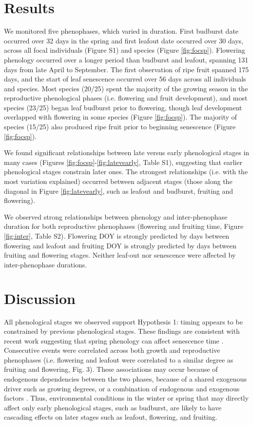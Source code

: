 \documentclass{article}
\begin{document}
\section* {Results}
\par We monitored five phenophases, which varied in duration. First budburst date occurred over 32 days in the spring and first leafout date occurred over 30 days, across all focal individuals (Figure S1) and species (Figure \ref{fig:focsp}). Flowering phenology occurred over a longer period than budburst and leafout, spanning 131 days from late April to September. The first observation of ripe fruit spanned 175 days, and the start of leaf senescence occurred over 56 days across all individuals and species. Most species (20/25) spent the majority of the growing season in the reproductive phenological phases (i.e. flowering and fruit development), and most species (23/25) began leaf budburst prior to flowering, though leaf development overlapped with flowering in some species (Figure \ref{fig:focsp}). The majority of species (15/25) also produced ripe fruit prior to beginning senescence (Figure \ref{fig:focsp}).
\par We found significant relationships between late versus early phenological stages in many cases (Figures \ref{fig:focsp}-\ref{fig:latevearly}, Table S1), suggesting that earlier phenological stages constrain later ones. The strongest relationships (i.e. with the most variation explained) occurred between adjacent stages (those along the diagonal in Figure \ref{fig:latevearly}, such as leafout and budburst, fruiting and flowering). 

\par We observed strong relationships between phenology and inter-phenophase duration for both reproductive phenophases (flowering and fruiting time, Figure \ref{fig:inter}, Table S2). Flowering DOY is strongly predicted by days between flowering and leafout and fruiting DOY is strongly predicted by days between fruiting and flowering stages. Neither leaf-out nor senescence were affected by inter-phenophase durations.

\section* {Discussion}
\par All phenological stages we observed support Hypothesis 1: timing appears to be constrained by previous phenological stages. These findings are consistent with recent work suggesting that spring phenology can affect senescence time \citep{keenan2015,liu2016}. Consecutive events were correlated across both growth and reproductive phenophases (i.e. flowering and leafout were correlated to a similar degree as fruiting and flowering, Fig. 3). These associations may occur because of endogenous dependencies between the two phases, because of a shared exogenous driver such as growing degrees, or a combination of endogenous and exogenous factors \citep{lechowicz1995}. Thus, environmental conditions in the winter or spring that may directly affect only early phenological stages, such as budburst, are likely to have cascading effects on later stages such as leafout, flowering, and fruiting. 
\end{document}
